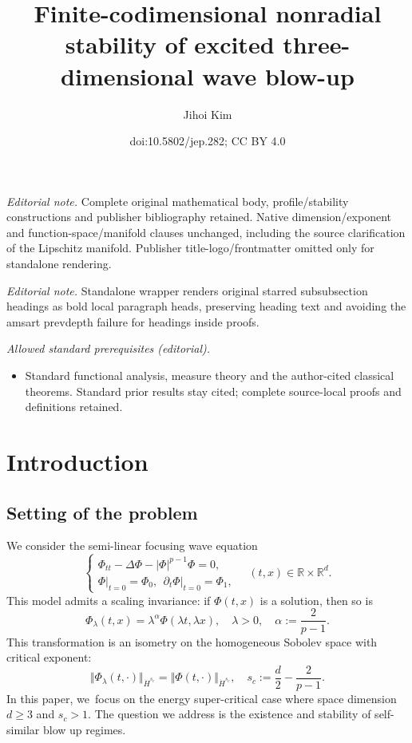 \documentclass[10pt]{amsart}
\title{Finite-codimensional nonradial stability of excited three-dimensional wave blow-up}
\author{Jihoi Kim}
\date{doi:10.5802/jep.282; CC BY 4.0}
\theoremstyle{plain}
\theoremstyle{definition}
\begin{document}
\maketitle
\noindent\textit{Editorial note.} Complete original mathematical body, profile/stability constructions and publisher bibliography retained. Native dimension/exponent and function-space/manifold clauses unchanged, including the source clarification of the Lipschitz manifold. Publisher title-logo/frontmatter omitted only for standalone rendering.\par\medskip
\noindent\textit{Editorial note.} Standalone wrapper renders original starred subsubsection headings as bold local paragraph heads, preserving heading text and avoiding the amsart prevdepth failure for headings inside proofs.\par\medskip
\noindent\textit{Allowed standard prerequisites (editorial).}\begin{itemize}
\item Standard functional analysis, measure theory and the author-cited classical theorems. Standard prior results stay cited; complete source-local proofs and definitions retained.
\end{itemize}\medskip
\vspace*{-\baselineskip}
\tableofcontents


\section{Introduction}

\subsection{Setting of the problem} We consider the semi-linear focusing wave equation
\begin{equation}
\label{eq: Nonlinear Wave}
\begin{cases}\Phi_{tt}-\Delta\Phi-|\Phi|^{p-1}\Phi=0,\\
\Phi\big|_{t=0}=\Phi_0,\ \ \partial_t\Phi\big|_{t=0}=\Phi_1,\end{cases}
\quad (t,x) \in \mathbb R\times \mathbb R^d.
\end{equation}
This model admits a scaling invariance: if $\Phi(t,x)$ is a solution, then so is
\[
\Phi_\lambda(t,x)=\lambda^\alpha \Phi(\lambda t,\lambda x),\quad \lambda>0,\quad \alpha:=\frac{2}{p-1}.
\]
This transformation is an isometry on the homogeneous Sobolev space with critical exponent:
\begin{equation}
\label{eq: Critical Scaling}
\Vert \Phi_\lambda(t,\cdot)\Vert_{\dot H^{s_c}}=\Vert \Phi(t,\cdot)\Vert_{\dot H^{s_c}},\quad s_c:=\frac{d}{2}-\frac{2}{p-1}.
\end{equation}
In this paper, we~focus on the energy super-critical case where space dimension $d\ge 3$ and $s_c>1$. The question we address is the existence and stability of self-similar blow up regimes.
\end{document}
